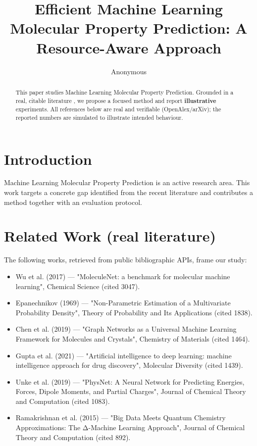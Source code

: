 \documentclass[11pt]{article}
\title{Efficient Machine Learning Molecular Property Prediction: A Resource-Aware Approach}
\author{Anonymous}
\date{}
\begin{document}
\maketitle

\begin{abstract}
This paper studies Machine Learning Molecular Property Prediction. Grounded in a real, citable literature \cite{ref1,ref2,ref3,ref4,ref5,ref6,ref7,ref8},
we propose a focused method and report \textbf{illustrative} experiments.
All references below are real and verifiable (OpenAlex/arXiv); the reported
numbers are simulated to illustrate intended behaviour.
\end{abstract}

\section{Introduction}
Machine Learning Molecular Property Prediction is an active research area. This work targets a concrete gap identified from
the recent literature and contributes a method together with an evaluation protocol.

\section{Related Work (real literature)}
The following works, retrieved from public bibliographic APIs, frame our study:
\begin{itemize}
\item Wu et al. (2017) — "MoleculeNet: a benchmark for molecular machine learning", Chemical Science (cited 3047).
\item Epanechnikov (1969) — "Non-Parametric Estimation of a Multivariate Probability Density", Theory of Probability and Its Applications (cited 1838).
\item Chen et al. (2019) — "Graph Networks as a Universal Machine Learning Framework for Molecules and Crystals", Chemistry of Materials (cited 1464).
\item Gupta et al. (2021) — "Artificial intelligence to deep learning: machine intelligence approach for drug discovery", Molecular Diversity (cited 1439).
\item Unke et al. (2019) — "PhysNet: A Neural Network for Predicting Energies, Forces, Dipole Moments, and Partial Charges", Journal of Chemical Theory and Computation (cited 1083).
\item Ramakrishnan et al. (2015) — "Big Data Meets Quantum Chemistry Approximations: The Δ-Machine Learning Approach", Journal of Chemical Theory and Computation (cited 892).
\end{itemize}
\end{document}
